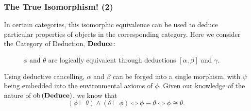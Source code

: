 \documentclass{beamer}
\numberwithin{figure}{section}
\begin{document}
\begin{frame}
        \frametitle{The True Isomorphism! (2)}
        In certain categories, this isomorphic equivalence can be used to deduce
        particular properties of objects in the corresponding category. Here we
        consider the Category of Deduction, $\operatorname{\mathbf{Deduce}}$:
        \pause
        \begin{figure}
                \caption{$\phi$ and $\theta$ are logically equivalent through
                deductions $[\alpha,\beta]$ and $\gamma$.}
        \end{figure}
        \pause
        Using deductive cancelling, $\alpha$ and $\beta$ can be forged into a
        single morphism, with $\psi$ being embedded into the environmental
        axioms of $\phi$.  Given our knowledge of the nature of $\catobj%
        {(\catdeduce)}$, we know that
        \begin{equation*}
                (\phi \vdash \theta) \land (\theta \vdash \phi) \iff
                        \phi \equiv \theta \iff \phi \cong \theta.
        \end{equation*}
\end{frame}

%
\end{document}
